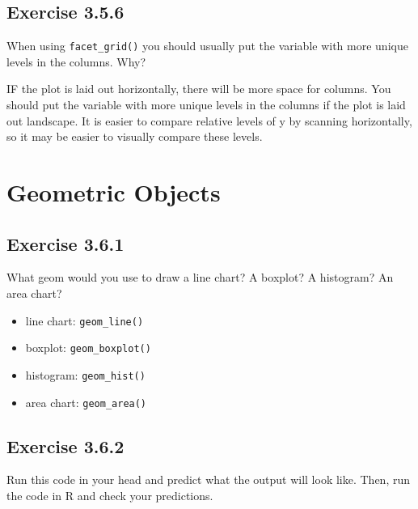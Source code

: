 \documentclass[]{book}
\providecommand{\tightlist}{%
  \setlength{\itemsep}{0pt}\setlength{\parskip}{0pt}}
\theoremstyle{plain}
\theoremstyle{remark}
\theoremstyle{definition}
\theoremstyle{definition}
\theoremstyle{definition}
\theoremstyle{remark}
\begin{document}
\hypertarget{exercise-3.5.6}{%
\subsection*{\texorpdfstring{Exercise
{3.5.6}}{Exercise 3.5.6}}\label{exercise-3.5.6}}

When using \texttt{facet\_grid()} you should usually put the variable
with more unique levels in the columns. Why?

IF the plot is laid out horizontally, there will be more space for
columns. You should put the variable with more unique levels in the
columns if the plot is laid out landscape. It is easier to compare
relative levels of y by scanning horizontally, so it may be easier to
visually compare these levels.

\hypertarget{geometric-objects}{%
\section{Geometric Objects}\label{geometric-objects}}

\hypertarget{exercise-3.6.1}{%
\subsection*{\texorpdfstring{Exercise
{3.6.1}}{Exercise 3.6.1}}\label{exercise-3.6.1}}

What geom would you use to draw a line chart? A boxplot? A histogram? An
area chart?

\begin{itemize}
\tightlist
\item
  line chart: \texttt{geom\_line()}
\item
  boxplot: \texttt{geom\_boxplot()}
\item
  histogram: \texttt{geom\_hist()}
\item
  area chart: \texttt{geom\_area()}
\end{itemize}

\hypertarget{exercise-3.6.2}{%
\subsection*{\texorpdfstring{Exercise
{3.6.2}}{Exercise 3.6.2}}\label{exercise-3.6.2}}

Run this code in your head and predict what the output will look like.
Then, run the code in R and check your predictions.
\end{document}
